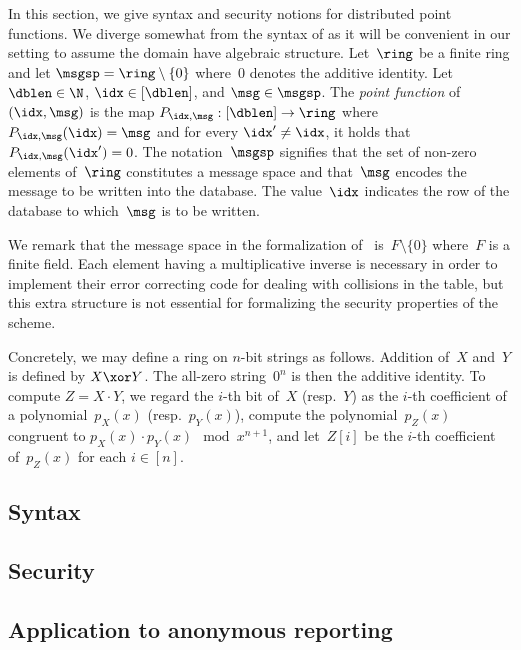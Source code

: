 %

In this section, we give syntax and security notions for distributed point
functions. We diverge somewhat from the syntax of \cite{dpf} as it will be
convenient in our setting to assume the domain have algebraic
structure.
Let~$\ring$ be a finite ring and let $\msgsp = \ring \setminus \{ 0 \}$
where~$0$ denotes the additive identity. Let $\dblen \in \N$, $\idx \in
[\dblen]$, and $\msg \in \msgsp$.
%
The \emph{point function} of $(\idx, \msg)$ is the map $P_{\idx,\msg} : [\dblen]
\to \ring$ where $P_{\idx,\msg}(\idx) = \msg$ and for every $\idx^\prime \ne
\idx$, it holds that $P_{\idx,\msg}(\idx^\prime) = 0$.
%
The notation~$\msgsp$ signifies that the set of non-zero elements of~$\ring$
constitutes a message space and that~$\msg$ encodes the message to be written
into the database. The value~$\idx$ indicates the row of the database to
which~$\msg$ is to be written.

We remark that the message space in the formalization of~\cite{riposte} is~$F
\setminus \{0\}$ where~$F$ is a finite field. Each element having a
multiplicative inverse is necessary in order to implement their error correcting
code for dealing with collisions in the table, but this extra structure is not
essential for formalizing the security properties of the scheme.

Concretely, we may define a ring on $n$-bit strings as follows.  Addition of~$X$
and~$Y$ is defined by $X \xor Y$. The all-zero string~$0^n$ is then the additive
identity. To compute $Z = X\cdot Y$, we regard the $i$-th bit of~$X$ (resp.~$Y$)
as the $i$-th coefficient of a polynomial~$p_X(x)$ (resp.~$p_Y(x)$), compute the
polynomial~$p_Z(x)$ congruent to $p_X(x)\cdot p_Y(x) \mod x^{n+1}$, and
let~$Z[i]$ be the $i$-th coefficient of~$p_Z(x)$ for each $i \in
[n]$.

\subsection{Syntax}


\subsection{Security}


\subsection{Application to anonymous reporting}

